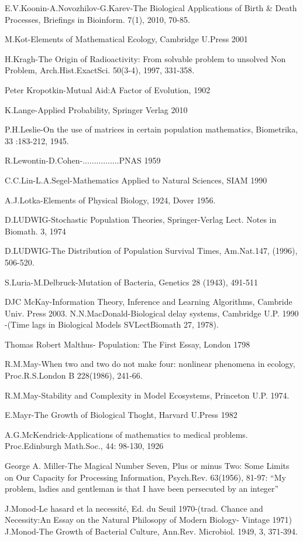 E.V.Koonin-A.Novozhilov-G.Karev-The Biological Applications of Birth \& Death Processes, Briefings in Bioinform. 7(1), 2010, 70-85. 

M.Kot-Elements of Mathematical Ecology, Cambridge U.Press 2001 

H.Kragh-The Origin of Radioactivity: From solvable problem to unsolved Non Problem, Arch.Hist.ExactSci. 50(3-4), 1997, 331-358. 

Peter Kropotkin-Mutual Aid:A Factor of Evolution, 1902 

K.Lange-Applied Probability, Springer Verlag 2010 

P.H.Leslie-On the use of matrices in certain population mathematics, Biometrika, 33 :183-212, 1945. 

R.Lewontin-D.Cohen-................PNAS 1959 

C.C.Lin-L.A.Segel-Mathematics Applied to Natural Sciences, SIAM 1990 

A.J.Lotka-Elements of Physical Biology, 1924, Dover 1956. 

D.LUDWIG-Stochastic Population Theories, Springer-Verlag Lect. Notes in Biomath. 3, 1974 

D.LUDWIG-The Distribution of Population Survival Times, Am.Nat.147, (1996), 506-520. 

S.Luria-M.Delbruck-Mutation of Bacteria, Genetics 28 (1943), 491-511 

DJC McKay-Information Theory, Inference and Learning Algorithms, Cambride Univ. Press 2003. 
N.N.MacDonald-Biological delay systems, Cambridge U.P. 1990 -(Time lags in Biological Models SVLectBiomath 27, 1978). 

Thomas Robert Malthus- Population: The First Essay, London 1798 

R.M.May-When two and two do not make four: nonlinear phenomena in ecology, Proc.R.S.London B 228(1986), 241-66. 

R.M.May-Stability and Complexity in Model Ecosystems, Princeton U.P. 1974. 

E.Mayr-The Growth of Biological Thoght, Harvard U.Press 1982 

A.G.McKendrick-Applications of mathematics to medical problems. Proc.Edinburgh Math.Soc., 44: 98-130, 1926 

George A. Miller-The Magical Number Seven, Plus or minus Two: Some Limits on Our Capacity for Processing Information, Psych.Rev. 63(1956), 81-97: ``My problem, ladies and gentleman is that I have been persecuted by an integer'' 

J.Monod-Le hasard et la necessité, Ed. du Seuil 1970-(trad. Chance and Necessity:An Essay on the Natural Philosopy of Modern Biology- Vintage 1971) J.Monod-The Growth of Bacterial Culture, Ann.Rev. Microbiol. 1949, 3, 371-394. 

